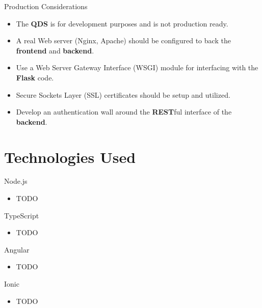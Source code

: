 \documentclass{beamer}
\begin{document}
\begin{frame}{Production Considerations}
    \begin{itemize}
        \item The \textbf{QDS} is for development purposes and is not production
            ready.
        \item A real Web server (Nginx, Apache) should be configured to back the
            \textbf{frontend} and \textbf{backend}.
        \item Use a Web Server Gateway Interface (WSGI) module for interfacing
            with the \textbf{Flask} code.
        \item Secure Sockets Layer (SSL) certificates should be setup and
            utilized.
        \item Develop an authentication wall around the \textbf{REST}ful
            interface of the \textbf{backend}.
    \end{itemize}
\end{frame}

\section{Technologies Used}

\begin{frame}{Node.js}
    \begin{itemize}
        \item TODO
    \end{itemize}
\end{frame}

\begin{frame}{TypeScript}
    \begin{itemize}
        \item TODO
    \end{itemize}
\end{frame}

\begin{frame}{Angular}
    \begin{itemize}
        \item TODO
    \end{itemize}
\end{frame}

\begin{frame}{Ionic}
    \begin{itemize}
        \item TODO
    \end{itemize}
\end{frame}
\end{document}

